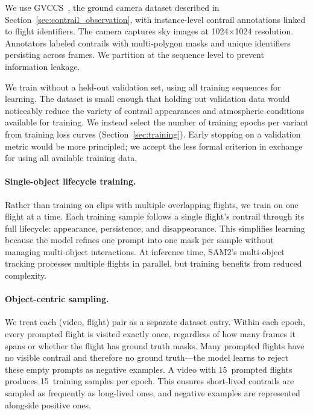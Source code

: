 \documentclass[review]{elsarticle}
\begin{document}
We use GVCCS~\cite{jarry2025gvccs}, the ground camera dataset described in Section~\ref{sec:contrail_observation}, with instance-level contrail annotations linked to flight identifiers. The camera captures sky images at 1024$\times$1024 resolution. Annotators labeled contrails with multi-polygon masks and unique identifiers persisting across frames. We partition at the sequence level to prevent information leakage.

We train without a held-out validation set, using all training sequences for learning. The dataset is small enough that holding out validation data would noticeably reduce the variety of contrail appearances and atmospheric conditions available for training. We instead select the number of training epochs per variant from training loss curves (Section~\ref{sec:training}). Early stopping on a validation metric would be more principled; we accept the less formal criterion in exchange for using all available training data.

\paragraph{Single-object lifecycle training.} Rather than training on clips with multiple overlapping flights, we train on one flight at a time. Each training sample follows a single flight's contrail through its full lifecycle: appearance, persistence, and disappearance. This simplifies learning because the model refines one prompt into one mask per sample without managing multi-object interactions. At inference time, SAM2's multi-object tracking processes multiple flights in parallel, but training benefits from reduced complexity. 

\paragraph{Object-centric sampling.} We treat each (video, flight) pair as a separate dataset entry. Within each epoch, every prompted flight is visited exactly once, regardless of how many frames it spans or whether the flight has ground truth masks. Many prompted flights have no visible contrail and therefore no ground truth---the model learns to reject these empty prompts as negative examples. A video with 15~prompted flights produces 15~training samples per epoch. This ensures short-lived contrails are sampled as frequently as long-lived ones, and negative examples are represented alongside positive ones.
\end{document}

